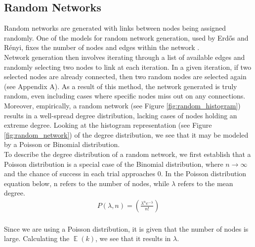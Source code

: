 \documentclass[journal]{IEEEtran}
\DeclareMathOperator{\EX}{\mathbb{E}}%
\begin{document}
\subsection{Random Networks}

\noindent Random networks are generated with links between nodes being assigned randomly. One of the models for random network generation, used by Erdős and Rényi, fixes the number of nodes and edges within the network \cite{barabasi2016network}. \\

\noindent Network generation then involves iterating through a list of available edges and randomly selecting two nodes to link at each iteration. In a given iteration, if two selected nodes are already connected, then two random nodes are selected again (see Appendix A). As a result of this method, the network generated is truly random, even including cases where specific nodes miss out on any connections. Moreover, empirically, a random network (see Figure \ref{fig:random_histogram}) results in a well-spread degree distribution, lacking cases of nodes holding an extreme degree. Looking at the histogram representation (see Figure \ref{fig:random_network}) of the degree distribution, we see that it may be modeled by a Poisson or Binomial distribution.\\

\noindent To describe the degree distribution of a random network, we first establish that a Poisson distribution is a special case of the Binomial distribution, where $n \rightarrow \infty$ and the chance of success in each trial approaches 0. In the Poisson distribution equation below, n refers to the number of nodes, while $\lambda$ refers to the mean degree.\\

\begin{equation}
    \begin{split}
        P(\lambda, n) = (\frac{\lambda^n e^{-\lambda}}{n!})
    \end{split}
    \label{eq:poisson_distribution}
\end{equation}
\\

\noindent Since we are using a Poisson distribution, it is given that the number of nodes is large. Calculating the $\EX(k)$, we see that it results in $\lambda$. 
\end{document}
